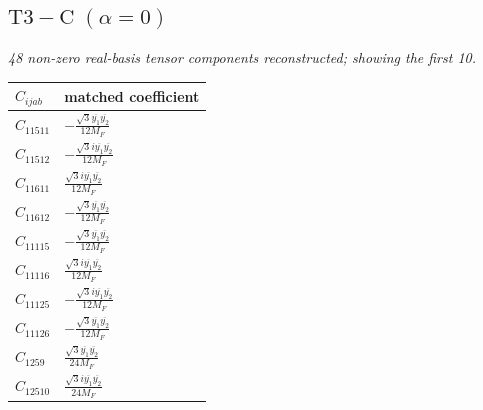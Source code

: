 \documentclass[9pt]{article}
\begin{document}
\subsection*{$ \mathrm{T3-C}\;(\alpha=0) $}
\textit{48 non-zero real-basis tensor components reconstructed; showing the first 10.}
\begin{longtable}{@{}ll@{}}
\toprule
$C_{ijab}$ & matched coefficient \\
\midrule
$C_{11511}$ & $ - \frac{\sqrt{3} \overline{y_{1}} \overline{y_{2}}}{12 M_F} $ \\
$C_{11512}$ & $ - \frac{\sqrt{3} i \overline{y_{1}} \overline{y_{2}}}{12 M_F} $ \\
$C_{11611}$ & $ \frac{\sqrt{3} i \overline{y_{1}} \overline{y_{2}}}{12 M_F} $ \\
$C_{11612}$ & $ - \frac{\sqrt{3} \overline{y_{1}} \overline{y_{2}}}{12 M_F} $ \\
$C_{11115}$ & $ - \frac{\sqrt{3} \overline{y_{1}} \overline{y_{2}}}{12 M_F} $ \\
$C_{11116}$ & $ \frac{\sqrt{3} i \overline{y_{1}} \overline{y_{2}}}{12 M_F} $ \\
$C_{11125}$ & $ - \frac{\sqrt{3} i \overline{y_{1}} \overline{y_{2}}}{12 M_F} $ \\
$C_{11126}$ & $ - \frac{\sqrt{3} \overline{y_{1}} \overline{y_{2}}}{12 M_F} $ \\
$C_{1259}$ & $ \frac{\sqrt{3} \overline{y_{1}} \overline{y_{2}}}{24 M_F} $ \\
$C_{12510}$ & $ \frac{\sqrt{3} i \overline{y_{1}} \overline{y_{2}}}{24 M_F} $ \\
\bottomrule
\end{longtable}
\end{document}
